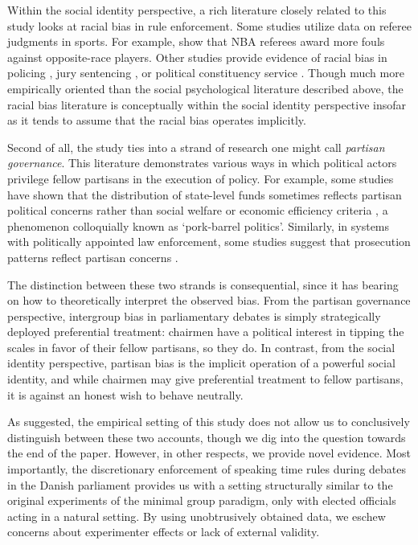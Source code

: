 \documentclass[12pt,a4paper]{article}
\begin{document}
Within the social identity perspective, a rich literature closely related to this study looks at racial bias in rule enforcement. Some studies utilize data on referee judgments in sports. For example, \cite{Price2010} show that NBA referees award more fouls against opposite-race players. Other studies provide evidence of racial bias in policing \citep{Donohue2001,Antonovics2009}, jury sentencing \citep{Anwar2012}, or political constituency service \citep{Butler2011}. Though much more empirically oriented than the social psychological literature described above, the racial bias literature is conceptually within the social identity perspective insofar as it tends to assume that the racial bias operates implicitly.

Second of all, the study ties into a strand of research one might call \textit{partisan governance}. This literature demonstrates various ways in which political actors privilege fellow partisans in the execution of policy. For example, some studies have shown that the distribution of state-level funds sometimes reflects partisan political concerns rather than social welfare or economic efficiency criteria \citep{Dahlberg2002,Stratmann2002,Larcinese2008}, a phenomenon colloquially known as `pork-barrel politics'. Similarly, in systems with politically appointed law enforcement, some studies suggest that prosecution patterns reflect partisan concerns \citep{Gordon2009}.

The distinction between these two strands is consequential, since it has bearing on how to theoretically interpret the observed bias. From the partisan governance perspective, intergroup bias in parliamentary debates is simply strategically deployed preferential treatment: chairmen have a political interest in tipping the scales in favor of their fellow partisans, so they do. In contrast, from the social identity perspective, partisan bias is the implicit operation of a powerful social identity, and while chairmen may give preferential treatment to fellow partisans, it is against an honest wish to behave neutrally.  

As suggested, the empirical setting of this study does not allow us to conclusively distinguish between these two accounts, though we dig into the question towards the end of the paper. However, in other respects, we provide novel evidence. Most importantly, the discretionary enforcement of speaking time rules during debates in the Danish parliament provides us with a setting structurally similar to the original experiments of the minimal group paradigm, only with elected officials acting in a natural setting. By using unobtrusively obtained data, we eschew concerns about experimenter effects or lack of external validity. 
\end{document}
